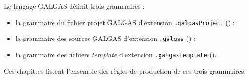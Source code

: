 

Le langage GALGAS définit trois grammaires :
\begin{itemize}
\item la grammaire du fichier projet GALGAS d'extension \texttt{.galgasProject} () ;
\item la grammaire des sources GALGAS d'extension \texttt{.galgas} () ;
\item la grammaire des fichiers \emph{template} d'extension \texttt{.galgasTemplate} ().
\end{itemize}

Ces chapitres listent l'ensemble des règles de production de ces trois grammaires.




